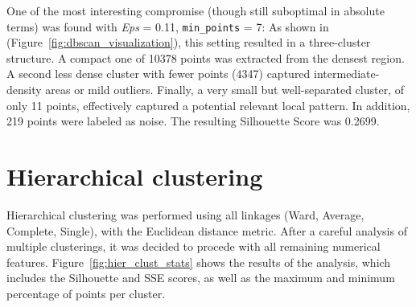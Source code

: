 One of the most interesting compromise (though still suboptimal in absolute terms) was found with \textit{Eps} = 0.11, \texttt{min\_points} = 7: 
As shown in (Figure~\ref{fig:dbscan_visualization}), this setting resulted in a three-cluster structure. A compact one of 10378 points was extracted from the densest region.
A second less dense cluster with fewer points (4347) captured intermediate-density areas or mild outliers. 
Finally, a very small but well-separated cluster, of only 11 points, effectively captured a potential relevant local pattern. 
In addition, 219 points were labeled as noise.
The resulting Silhouette Score was 0.2699.\\












\section{Hierarchical clustering}\label{sec:hierarchical}
Hierarchical clustering was performed using all linkages (Ward, Average, Complete, Single), with the Euclidean
distance metric. After a careful analysis of multiple clusterings, it was decided to procede with
all remaining numerical features.
Figure~\ref{fig:hier_clust_stats} shows the results of the analysis, which includes the Silhouette and SSE
scores, as well as the maximum and minimum percentage of points per cluster.\\

